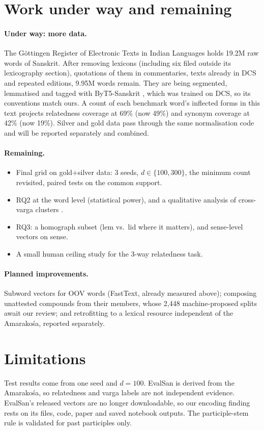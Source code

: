 \documentclass[11pt]{article}
\newcommand{\vk}[1]{\textsf{#1}}
\begin{document}
\section{Work under way and remaining}\label{sec:next}
\paragraph{Under way: more data.} The Göttingen Register of Electronic Texts in
Indian Languages \citep{gretil} holds 19.2M raw words of Sanskrit. After removing
lexicons (including six filed outside its lexicography section), quotations
of them in commentaries, texts already in DCS and repeated editions, 9.95M
words remain. They are being segmented, lemmatised and tagged with
ByT5-Sanskrit \citep{nehrdich2024byt5}, which was trained on DCS, so its
conventions match ours. A count of each benchmark word's inflected forms in
this text projects relatedness coverage at 69\% (now 49\%) and synonym
coverage at 42\% (now 19\%). Silver and gold data pass through the same
normalisation code and will be reported separately and combined.

\paragraph{Remaining.}
\begin{itemize}
\item Final grid on gold+silver data: 3 seeds, $d\in\{100,300\}$, the
  minimum count revisited, paired tests on the common support.
\item RQ2 at the word level (statistical power), and a qualitative analysis
  of cross-varga clusters \citep{agirre2009study}.
\item RQ3: a homograph subset (\vk{lem} vs.\ \vk{lid} where it matters), and
  sense-level vectors on \vk{sense}.
\item A small human ceiling study for the 3-way relatedness task.
\end{itemize}
\paragraph{Planned improvements.} Subword vectors for OOV words (FastText,
already measured above); composing unattested compounds from their members,
whose 2,448 machine-proposed splits await our review; and retrofitting to a
lexical resource independent of the Amarakośa, reported separately.

\section*{Limitations}
Test results come from one seed and $d=100$. EvalSan is derived from the
Amarakośa, so relatedness and varga labels are not independent evidence.
EvalSan's released vectors are no longer downloadable, so our encoding
finding rests on its files, code, paper and saved notebook outputs. The
participle-stem rule is validated for past participles only.


\end{document}
